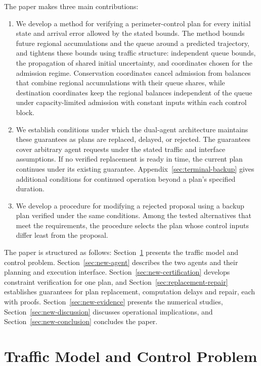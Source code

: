 \documentclass[final]{cas-sc}
\theoremstyle{definition}
\theoremstyle{plain}
\theoremstyle{definition}
\theoremstyle{plain}
\newcommand{\appref}[1]{Appendix~\ref{#1}}
\begin{document}
The paper makes three main contributions:
\begin{enumerate}
\item We develop a method for verifying a perimeter-control plan for
every initial state and arrival error allowed by the stated bounds. The
method bounds future regional accumulations and the queue around a
predicted trajectory, and tightens these bounds using traffic
structure: independent queue bounds, the propagation of shared initial
uncertainty, and coordinates chosen for the admission regime.
Conservation coordinates cancel admission from balances that combine
regional accumulations with their queue shares, while destination
coordinates keep the regional balances independent of the queue under
capacity-limited admission with constant inputs within each control block.

\item We establish conditions under which the dual-agent architecture
maintains these guarantees as plans are replaced, delayed, or rejected.
The guarantees cover arbitrary agent requests under the stated traffic
and interface assumptions. If no verified replacement is ready in time,
the current plan continues under its existing guarantee.
\appref{sec:terminal-backup} gives additional conditions for continued
operation beyond a plan's specified duration.

\item We develop a procedure for modifying a rejected proposal using a
backup plan verified under the same conditions. Among the tested
alternatives that meet the requirements, the procedure selects the plan
whose control inputs differ least from the proposal.
\end{enumerate}

The paper is structured as follows:
Section~\ref{sec:new-problem} presents the traffic model and control
problem. Section~\ref{sec:new-agent} describes the two agents and their
planning and execution interface. Section~\ref{sec:new-certification} develops
constraint verification for one plan, and Section~\ref{sec:replacement-repair}
establishes guarantees for plan replacement, computation delays and repair,
each with proofs.
Section~\ref{sec:new-evidence} presents the numerical studies,
Section~\ref{sec:new-discussion} discusses operational implications, and
Section~\ref{sec:new-conclusion} concludes the paper.

\section{Traffic Model and Control Problem}
\label{sec:new-problem}
\end{document}
